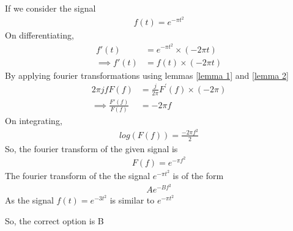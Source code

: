 \documentclass[journal,12pt,twocolumn]{IEEEtran}
\begin{document}
If we consider the signal
\begin{align}
    f(t) = e^{-\pi t^2}
\end{align}
On differentiating,
\begin{align}
     f'(t) &= e^{-\pi t^2}\times(-2\pi t)\\
    \implies f'(t) &= f(t)\times (-2\pi t)
\end{align}
By applying fourier transformations using lemmas \ref{lemma 1} and \ref{lemma 2}
\begin{align}
    2\pi jfF(f) &= \frac{j}{2\pi}F^{'}(f) \times (-2\pi)\\
    \implies \frac{F'(f)}{F(f)} &= -2\pi f
\end{align}
On integrating,
\begin{align}
    log(F(f)) = \frac{-2\pi f^2}{2}
\end{align}
So, the fourier transform of the given signal is
\begin{align}
    F(f) = e^{-\pi f^2}
\end{align}
The fourier transform of the the signal $e^{-\pi t^2}$ is of the form 
\begin{align}
    Ae^{-Bf^2}
\end{align}
As the signal $f(t) = e^{-3t^2}$ is similar to $e^{-\pi t^2}$

So, the correct option is B
\end{document}

